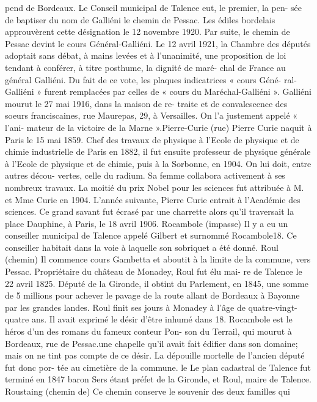 \documentclass[a4paper,11pt]{book}
\begin{document}
pend de Bordeaux.
Le Conseil municipal de Talence eut, le premier, la pen-
sée de baptiser du nom de Galliéni le chemin de Pessac.
Les édiles bordelais approuvèrent cette désignation le 12
novembre 1920. Par suite, le chemin de Pessac devint le
cours Général-Galliéni.
Le 12 avril 1921, la Chambre des députés adoptait sans
débat, à mains levées et à l'unanimité, une proposition de
loi tendant à conférer, à titre posthume, la dignité de maré-
chal de France au général Galliéni.
Du fait de ce vote, les plaques indicatrices « cours Géné-
ral-Galliéni » furent remplacées par celles de « cours du
Maréchal-Galliéni ».
Galliéni mourut le 27 mai 1916, dans la maison de re-
traite et de convalescence des soeurs franciscaines, rue
Maurepas, 29, à Versailles. On l'a justement appelé « l'ani-
mateur de la victoire de la Marne ».Pierre-Curie (rue)
Pierre Curie naquit à Paris le 15 mai 1859. Chef des
travaux de physique à l'Ecole de physique et de chimie
industrielle de Paris en 1882, il fut ensuite professeur de
physique générale à l'Ecole de physique et de chimie, puis
à la Sorbonne, en 1904. On lui doit, entre autres décou-
vertes, celle du radium. Sa femme collabora activement à
ses nombreux travaux. La moitié du prix Nobel pour les
sciences fut attribuée à M. et Mme Curie en 1904.
L'année suivante, Pierre Curie entrait à l'Académie des
sciences.
Ce grand savant fut écrasé par une charrette alors qu'il
traversait la place Dauphine, à Paris, le 18 avril 1906.
Rocambole (impasse)
Il y a eu un conseiller municipal de Talence appelé
Gilbert et surnommé Rocambole18. Ce conseiller habitait
dans la voie à laquelle son sobriquet a été donné.
Roul (chemin)
Il commence cours Gambetta et aboutit à la limite de
la commune, vers Pessac.
Propriétaire du château de Monadey, Roul fut élu mai-
re de Talence le 22 avril 1825. Député de la Gironde, il
obtint du Parlement, en 1845, une somme de 5 millions
pour achever le pavage de la route allant de Bordeaux à
Bayonne par les grandes landes.
Roul finit ses jours à Monadey à l'âge de quatre-vingt-
quatre ans. Il avait exprimé le désir d'être inhumé dans
18. Rocambole est le héros d'un des romans du fameux conteur Pon-
son du Terrail, qui mourut à Bordeaux, rue de Pessac.une chapelle qu'il avait fait édifier dans son domaine;
mais on ne tint pas compte de ce désir.
La dépouille mortelle de l'ancien député fut donc por-
tée au cimetière de la commune.
le
Le plan cadastral de Talence fut terminé en 1847
baron Sers étant préfet de la Gironde, et Roul, maire de
Talence.
Roustaing (chemin de)
Ce chemin conserve le souvenir des deux familles qui
\end{document}
